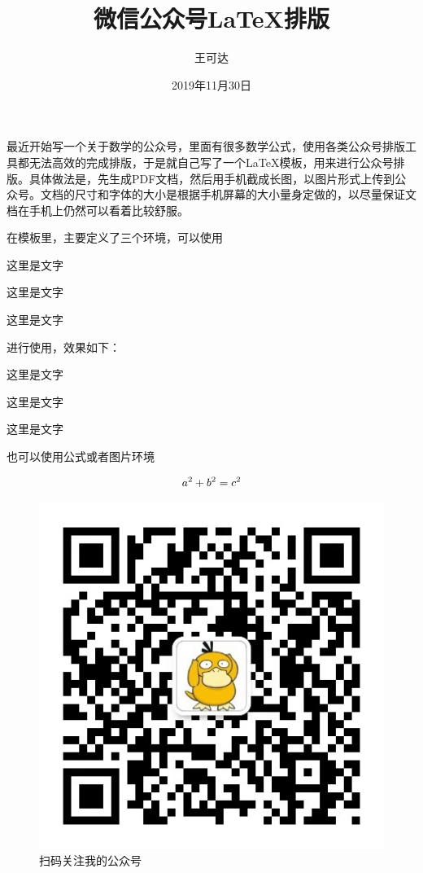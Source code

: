 \documentclass{wepub}
\title{微信公众号\LaTeX 排版}
\date{2019年11月30日}
\author{王可达}
\begin{document}
	\maketitle

\begin{weaxiom}
	最近开始写一个关于数学的公众号，里面有很多数学公式，使用各类公众号排版工具都无法高效的完成排版，于是就自己写了一个\LaTeX 模板，用来进行公众号排版。具体做法是，先生成PDF文档，然后用手机截成长图，以图片形式上传到公众号。文档的尺寸和字体的大小是根据手机屏幕的大小量身定做的，以尽量保证文档在手机上仍然可以看着比较舒服。
\end{weaxiom}
在模板里，主要定义了三个环境，可以使用
\begin{verbatim*}
\begin{wethm}
	这里是文字
\end{wethm}
\begin{welemma}
这里是文字
\end{welemma}
\begin{weaxiom}
这里是文字
\end{weaxiom}
\end{verbatim*}
进行使用，效果如下：
\begin{wethm}
	这里是文字
\end{wethm}
\begin{welemma}
	这里是文字
\end{welemma}
\begin{weaxiom}
	这里是文字
\end{weaxiom}
也可以使用公式或者图片环境
\begin{verbatim*}
\begin{equation}
a^2+b^2=c^2 \notag
\end{equation}

\begin{figure}[htbp]\caption{扫码关注我的公众号}
	\includegraphics[width=\linewidth]{logo.jpg}
\end{figure}
\end{verbatim*}
\end{document}
